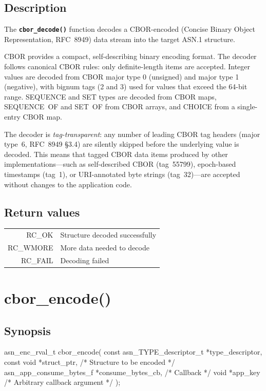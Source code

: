 \documentclass[english,oneside,12pt]{book}
\newcommand{\apisection}[2]{\clearpage\section{\label{#1}#2}}
\newcommand{\code}[1]{\texttt{\textbf{\lstinline{#1}}}}
\begin{document}
\subsection*{Description}

The \code{cbor_decode()} function decodes a CBOR-encoded (Concise Binary
Object Representation, RFC~8949) data stream into the target ASN.1 structure.

CBOR provides a compact, self-describing binary encoding format.
The decoder follows canonical CBOR rules: only definite-length items are
accepted. Integer values are decoded from CBOR major type 0 (unsigned) and
major type 1 (negative), with bignum tags (2 and 3) used for values that
exceed the 64-bit range. SEQUENCE and SET types are decoded from CBOR maps,
SEQUENCE~OF and SET~OF from CBOR arrays, and CHOICE from a single-entry
CBOR map.

The decoder is \emph{tag-transparent}: any number of leading CBOR tag headers
(major type~6, RFC~8949 \S3.4) are silently skipped before the underlying
value is decoded. This means that tagged CBOR data items produced by other
implementations---such as self-described CBOR (tag~55799), epoch-based
timestamps (tag~1), or URI-annotated byte strings (tag~32)---are accepted
without changes to the application code.

\subsection*{Return values}

\begin{tabular}[h!]{rl}
RC\_OK & Structure decoded successfully \\
RC\_WMORE & More data needed to decode \\
RC\_FAIL & Decoding failed
\end{tabular}

\apisection{sec:cbor_encode}{cbor\_encode()}

\subsection*{Synopsis}
\begin{signature}
asn_enc_rval_t cbor_encode(
    const asn_TYPE_descriptor_t *type_descriptor,
    const void *struct_ptr,             /* Structure to be encoded */
    asn_app_consume_bytes_f *consume_bytes_cb, /* Callback */
    void *app_key                       /* Arbitrary callback argument */
);
\end{signature}
\end{document}
